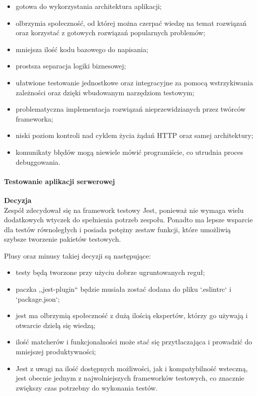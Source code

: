 \documentclass[12pt, a4paper, twoside, openany]{book}
\newcommand{\forceindent}{\leavevmode{\parindent=1.3em\indent}}
\begin{document}
\begin{itemize}
    \item gotowa do wykorzystania architektura aplikacji;
    \item olbrzymia społeczność, od której można czerpać wiedzę na temat rozwiązań 
    oraz korzystać z gotowych rozwiązań popularnych problemów;
    \item mniejsza ilość kodu bazowego do napisania;
    \item prostsza separacja logiki biznesowej;
    \item ułatwione testowanie jednostkowe oraz integracyjne za pomocą wstrzykiwania
    zależności oraz dzięki wbudowanym narzędziom testowym;
    \item problematyczna implementacja rozwiązań nieprzewidzianych przez twórców
    frameworka;
    \item niski poziom kontroli nad cyklem życia żądań HTTP oraz samej architektury;
    \item komunikaty błędów mogą niewiele mówić programiście, co utrudnia proces debuggowania.
\end{itemize}

\paragraph{Testowanie aplikacji serwerowej\\}
\forceindent \textbf{Decyzja\\}
\forceindent Zespół zdecydował się na framework testowy Jest, ponieważ nie wymaga wielu dodatkowych wtyczek do spełnienia potrzeb zespołu. Ponadto ma lepsze wsparcie dla testów równoległych i posiada potężny zestaw funkcji, które umożliwią szybsze tworzenie pakietów testowych.

Plusy oraz minusy takiej decyzji są następujące:
\begin{itemize}
    \item testy będą tworzone przy użyciu dobrze ugruntowanych reguł;
    \item paczka ,,jest-plugin`` będzie musiała zostać dodana do pliku `.eslintrc` i `package.json`;
    \item jest ma olbrzymią społeczność z dużą ilością ekspertów, którzy go używają i otwarcie dzielą się wiedzą;
    \item ilość matcherów i funkcjonalności może stać się przytłaczająca i prowadzić do mniejszej produktywności;
    \item Jest z uwagi na ilość dostępnych możliwości, jak i kompatybilność wsteczną, jest obecnie jednym z najwolniejszych frameworków testowych, co znacznie zwiększy czas potrzebny do wykonania testów.
\end{itemize}
\end{document}

